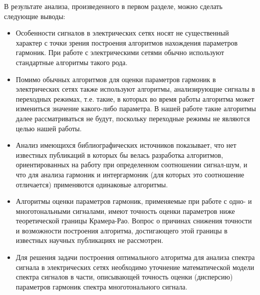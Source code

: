 В результате анализа, произведенного в первом разделе, можно сделать следующие выводы:
\begin{itemize}
\item Особенности сигналов в электрических сетях носят не существенный характер с точки зрения построения алгоритмов нахождения параметров гармоник. При работе с электрическими сетями обычно используют стандартные алгоритмы такого рода.

\item Помимо обычных алгоритмов для оценки параметров гармоник в электрических сетях также используют алгоритмы, анализирующие сигналы в переходных режимах, т.е. такие, в которых во время работы алгоритма может измениться значение какого-либо параметра. В нашей работе такие алгоритмы далее рассматриваться не будут, поскольку переходные режимы не являются целью нашей работы.

\item Анализ имеющихся библиографических источников показывает, что нет известных публикаций в которых бы велась разработка алгоритмов, ориентированных на работу при определенном соотношении сигнал-шум, и что для анализа гармоник и интергармоник (для которых это соотношение отличается) применяются одинаковые алгоритмы.

\item Алгоритмы оценки параметров гармоник, применяемые при работе с одно- и многотональными сигналами, имеют точность оценки параметров ниже теоретической границы Крамера-Рао. Вопрос о причинах снижения точности и возможности построения алгоритма, достигающего этой границы в известных научных публикациях не рассмотрен.

\item Для решения задачи построения оптимального алгоритма для анализа спектра сигнала в электрических сетях необходимо уточнение математической модели спектра сигналов в части, описывающей точность оценки (дисперсию) параметров гармоник спектра многотонального сигнала.
\end{itemize}

